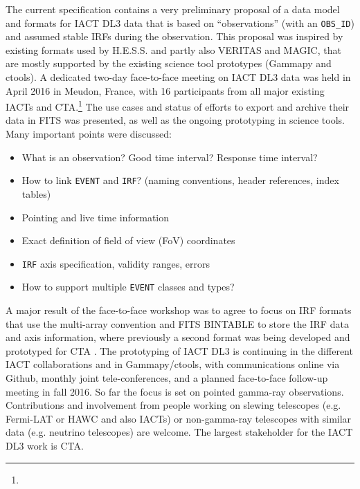 The current specification contains a very preliminary proposal of a data model and formats for IACT DL3 data that is based on ``observations'' (with an \texttt{OBS\_ID}) and assumed stable IRFs during the observation. This proposal was inspired by existing formats used by H.E.S.S. and partly also VERITAS and MAGIC, that are mostly supported by the existing science tool prototypes (Gammapy and ctools). 
A dedicated two-day face-to-face meeting on IACT DL3 data was held in April 2016 in Meudon, France, with 16 participants from all major existing IACTs and CTA.\footnote{\ogrameudon} The use cases and status of efforts to export and archive their data in FITS was presented, as well as the ongoing prototyping in science tools. Many important points were discussed:
%
\begin{itemize}
\item{}What is an observation? Good time interval? Response time interval?
\item{}How to link \texttt{EVENT} and \texttt{IRF}? (naming conventions, header references, index tables)
\item{}Pointing and live time information
\item{}Exact definition of field of view (FoV) coordinates
\item{}\texttt{IRF} axis specification, validity ranges, errors
\item{}How to support multiple \texttt{EVENT} classes and types?
\end{itemize}
%
A major result of the face-to-face workshop was to agree to focus on IRF formats that use the multi-array convention and FITS BINTABLE to store the IRF data and axis information, where previously a second format was being developed and prototyped for CTA \citep{2015arXiv150807437W}. The prototyping of IACT DL3 is continuing in the different IACT collaborations and in Gammapy/ctools, with communications online via Github, monthly joint tele-conferences, and a planned face-to-face follow-up meeting in fall 2016. So far the focus is set on pointed gamma-ray observations. Contributions and involvement from people working on slewing telescopes (e.g. Fermi-LAT or HAWC and also IACTs) or non-gamma-ray telescopes with similar data (e.g. neutrino telescopes) are welcome. The largest stakeholder for the IACT DL3 work is CTA.

